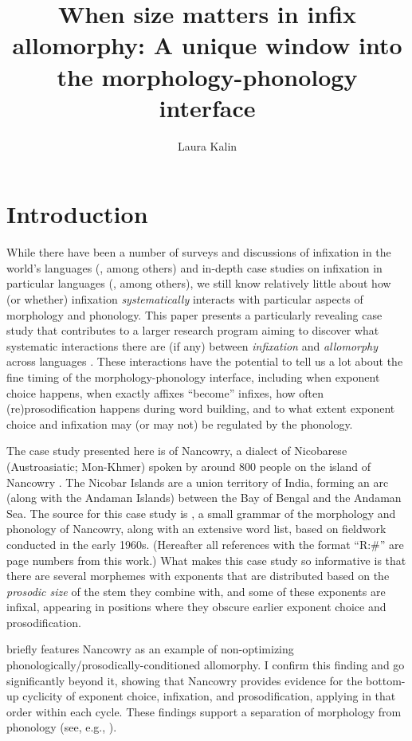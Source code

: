 \documentclass[output=paper]{langscibook}
\author{Laura Kalin\affiliation{Princeton University}}
\title[When size matters in infix allomorphy]
      {When size matters in infix allomorphy: A unique window into the morphology-phonology interface}
\begin{document}
\maketitle
\section{Introduction}


While there have been a number of surveys and discussions of infixation in the world's languages (\citealt{Mor77,Mor00,Ultan75,Yu07,Stek12,Blevins14}, among others) and in-depth case studies on infixation in particular languages (\citealt{HM91,Blevins99,Harizanov17,Yu17}, among others), we still know relatively little about how (or whether) infixation \textit{systematically} interacts with particular aspects of morphology and phonology. This paper presents a particularly revealing case study that contributes to a larger research program aiming to discover what systematic interactions there are (if any) between \textit{infixation} and \textit{allomorphy} across languages \citep{KalinIP}. These interactions have the potential to tell us a lot about the fine timing of the morphology-phonology interface, including when exponent choice happens, when exactly affixes ``become'' infixes, how often (re)prosodification happens during word building, and to what extent exponent choice and infixation may (or may not) be regulated by the phonology. %

The case study presented here is of Nancowry, a dialect of Nicobarese (Austroasiatic; Mon-Khmer) spoken by around 800 people on the island of Nancowry \citep[3]{Rad81}. The Nicobar Islands are a union territory of India, forming an arc (along with the Andaman Islands) between the Bay of Bengal and the Andaman Sea. The source for this case study is \citealt{Rad81}, a small grammar of the morphology and phonology of Nancowry, along with an extensive word list, based on fieldwork conducted in the early 1960s. (Hereafter all references with the format ``R:\#'' are page numbers from this work.) What makes this case study so informative is that there are several morphemes with exponents that are distributed based on the \textit{prosodic size} of the stem they combine with, and some of these exponents are infixal, appearing in positions where they obscure earlier exponent choice and prosodification. 

\citet{Paster05,Paster06} briefly features Nancowry as an example of non-optimizing phonologically/prosodically-conditioned allomorphy. I confirm this finding and go significantly beyond it, showing that Nancowry provides evidence for the bottom-up cyclicity of exponent choice, infixation, and prosodification, applying in that  order within each cycle. These findings support a separation of morphology from phonology (see, e.g., \citealt{HalleMarantz93,HalleMarantz94,Trommer01,Paster06,Yu07,Embick10,BS12,Pak16,Dawson17,Kalin20,KalinIP,Rolle20,Stanton20}).
\end{document}
